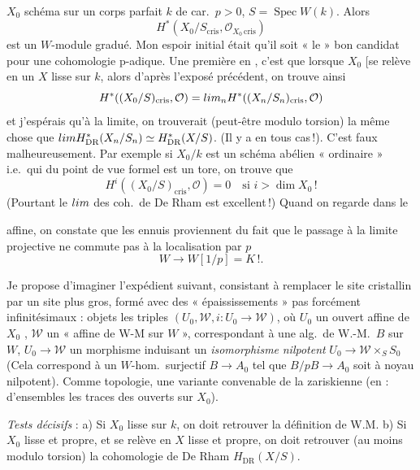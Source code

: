\documentclass[11pt,a4paper]{article}
\begin{document}
$X_0$ schéma sur un corps parfait $k$ de car.\ $p > 0$,
$S = \operatorname{Spec} W(k)$. Alors
\[
  H^{*}(X_0/S_{\mathrm{cris}}, \mathcal{O}_{X_0\,\mathrm{cris}})
\]
est un $W$-module gradué. \struck{\ill{}} Mon espoir initial était qu'il
soit  « le » bon candidat pour une cohomologie p-adique.
Une première \ill{} \struck{\ill{}} en \ill{}, c'est que lorsque $X_0$  [se relève en un $X$ \struck{\ill{}}
\add{\ill{}} lisse sur $k$, alors d'après l'exposé précédent, on trouve
ainsi
\[
  H^{*}((X_0/S)_{\mathrm{cris}}, \mathcal{O}) = \varprojlim_{n}
  H^{*}((X_n/S_n)_{\mathrm{cris}}, \mathcal{O})
\]
et j'espérais qu'à la limite, on trouverait (peut-être modulo
torsion) la même chose que
$\varprojlim H^{*}_{\mathrm{DR}}(X_n/S_n) \simeq H^{*}_{\mathrm{DR}}(X/S)$.
(Il y \struck{\ill{}} a  en tous cas\,!). C'est faux
malheureusement. Par exemple si $X_0/k$ est un schéma abélien
« ordinaire » i.e.\ qui du point de vue formel est un tore, on trouve
que
\[
  H^{i}((X_0/S)_{\mathrm{cris}}, \mathcal{O}) = 0 \quad \text{si } i > \dim X_0\,!
\]
(Pourtant le $\varprojlim$ des coh.\ de De Rham est excellent\,!)
\struck{\ill{}} Quand on regarde dans le 


affine, on constate que les ennuis proviennent du fait que le passage à la
limite projective ne commute pas à la localisation par $p$
\[
  W \longrightarrow W[1/p] = K\,! .
\]

Je propose d'imaginer l'expédient suivant, consistant à remplacer le site
cristallin par un site plus gros, formé avec des « épaississements » pas
forcément infinitésimaux : objets les triples
$(U_0, \mathcal{W}, i : U_0 \to \mathcal{W})$, où $U_0$ un ouvert affine de
$X_0$ , $\mathcal{W}$ un « \struck{\ill{}} affine de
W-M sur $W$ »,  correspondant à une
alg.\ de W.-M.\ $B$ sur $W$, $U_0 \to \mathcal{W}$ un
\struck{\ill{}} morphisme \struck{\ill{}} induisant un
\emph{isomorphisme} \emph{nilpotent} $U_0 \to \mathcal{W} \times_S S_0$
(Cela correspond à un $W$-hom.\ surjectif $B \to A_0$ tel que
$B/pB \to A_0$ soit à noyau nilpotent). Comme topologie, une variante
convenable de la zariskienne (en \ill{} \ill{} : \ill{} d'ensembles
\ill{}  les traces des ouverts sur $X_0$).


\emph{Tests décisifs} :
a) Si $X_0$ lisse  sur $k$, on doit retrouver la définition de
W.M.
b) Si $X_0$ lisse et propre, et se relève en $X$ lisse et propre, on doit
retrouver (au moins modulo torsion) la cohomologie de De Rham
$H_{\mathrm{DR}}(X/S)$.
\end{document}
